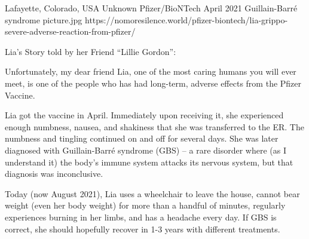 {Lafayette, Colorado, USA}
{Unknown}
{Pfizer/BioNTech}
{April 2021}
{Guillain-Barré syndrome}
{picture.jpg}
{https://nomoresilence.world/pfizer-biontech/lia-grippo-severe-adverse-reaction-from-pfizer/}
{

Lia’s Story told by her Friend “Lillie Gordon”:

Unfortunately, my dear friend Lia, one of the most caring humans you will ever
meet, is one of the people who has had long-term, adverse effects from the
Pfizer Vaccine.

Lia got the vaccine in April. Immediately upon receiving it, she experienced
enough numbness, nausea, and shakiness that she was transferred to the ER. The
numbness and tingling continued on and off for several days. She was later
diagnosed with Guillain-Barré syndrome (GBS) – a rare disorder where (as I
understand it) the body’s immune system attacks its nervous system, but that
diagnosis was inconclusive.

Today (now August 2021), Lia uses a wheelchair to leave the house, cannot bear
weight (even her body weight) for more than a handful of minutes, regularly
experiences burning in her limbs, and has a headache every day. If GBS is
correct, she should hopefully recover in 1-3 years with different treatments.

}
